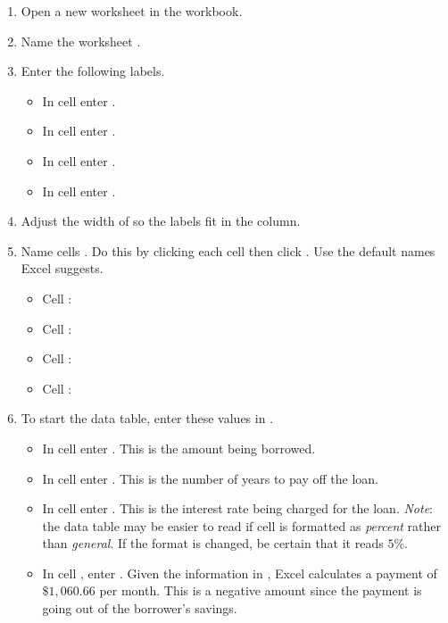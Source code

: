 \begin{enumerate}
	\item Open a new worksheet in the  workbook.
	\item Name the worksheet .
	\item Enter the following labels.
	
	\begin{itemize}
		\item In cell  enter .
		\item In cell  enter .
		\item In cell  enter .
		\item In cell  enter .
	\end{itemize}

	\item Adjust the width of  so the labels fit in the column.
	\item Name cells . Do this by clicking each cell then click . Use the default names Excel suggests.
	
	\begin{itemize}
		\item Cell : 
		\item Cell : 
		\item Cell : 
		\item Cell : 
	\end{itemize}
	
	\item To start the data table, enter these values in .
	
	\begin{itemize}
		\item In cell  enter . This is the amount being borrowed.
		\item In cell  enter . This is the number of years to pay off the loan.
		\item In cell  enter . This is the interest rate being charged for the loan. \textit{Note}: the data table may be easier to read if cell  is formatted as \textit{percent} rather than \textit{general}. If the format is changed, be certain that it reads $ 5\% $.
		\item In cell , enter . Given the information in , Excel calculates a payment of $ \$1,060.66 $ per month. This is a negative amount since the payment is going out of the borrower's savings.
	\end{itemize}


\end{enumerate}

